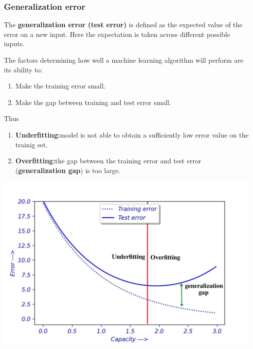 \documentclass[12pt,aspectratio=169]{beamer}
\begin{document}
\begin{frame}
\frametitle{Generalization error}
The \textbf{generalization error (test error)} is defined as the expected value of the error on a new input. Here the expectation is taken across different possible inputs.  
\end{frame}

\begin{frame}
The factors determining how well a machine learning algorithm will perform are its ability to:
\begin{enumerate}
\item Make the training error small.
\bigskip
\item Make the gap between training and test error small.
\end{enumerate}
Thus
\begin{enumerate}
\item \textbf{Underfitting:}model is not able to obtain a sufficiently low error value on the trainig set.
\bigskip
\item \textbf{Overfitting:}the gap between the training error and test error (\textbf{generalization gap}) is too large.
\end{enumerate}
\end{frame}

\begin{frame}
\begin{center}
\includegraphics[scale=0.8]{Overfitting}
\end{center}
\end{frame}
\end{document}
